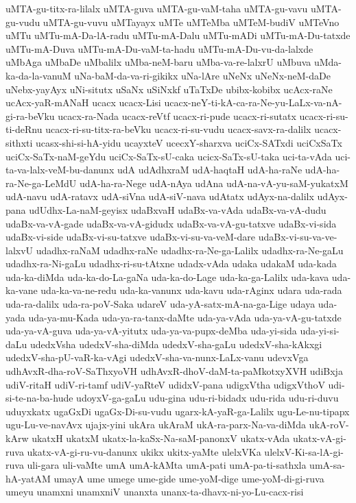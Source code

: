 {uMTA-gu-titx-ra-lilalx
uMTA-guva
uMTA-gu-vaM-taha
uMTA-gu-vavu
uMTA-gu-vudu
uMTA-gu-vuvu
uMTayayx
uMTe
uMTeMba
uMTeM-budiV
uMTeVno
uMTu
uMTu-mA-Da-lA-radu
uMTu-mA-Dalu
uMTu-mADi
uMTu-mA-Du-tatxde
uMTu-mA-Duva
uMTu-mA-Du-vaM-ta-hadu
uMTu-mA-Du-vu-da-lalxde
uMbAga
uMbaDe
uMbalilx
uMba-neM-baru
uMba-va-re-lalxrU
uMbuva
uMda-ka-da-la-vanuM
uNa-baM-da-va-ri-gikikx
uNa-lAre
uNeNx
uNeNx-neM-daDe
uNebx-yayAyx
uNi-situtx
uSaNx
uSiNxkf
uTaTxDe
ubibx-kobibx
ucAcx-raNe
ucAcx-yaR-mANaH
ucacx
ucacx-Lisi
ucacx-neY-ti-kA-ca-ra-Ne-yu-LaLx-va-nA-gi-ra-beVku
ucacx-ra-Nada
ucacx-reVtf
ucacx-ri-pude
ucacx-ri-sutatx
ucacx-ri-su-ti-deRnu
ucacx-ri-su-titx-ra-beVku
ucacx-ri-su-vudu
ucacx-savx-ra-dalilx
ucacx-sithxti
ucasx-shi-si-hA-yidu
ucayxteV
ucecxY-sharxva
uciCx-SATxdi
uciCxSaTx
uciCx-SaTx-naM-geYdu
uciCx-SaTx-sU-caka
ucicx-SaTx-sU-taka
uci-ta-vAda
uci-ta-va-lalx-veM-bu-danunx
udA
udAdhxraM
udA-haqtaH
udA-ha-raNe
udA-ha-ra-Ne-ga-LeMdU
udA-ha-ra-Nege
udA-nAya
udAna
udA-na-vA-yu-saM-yukatxM
udA-navu
udA-ratavx
udA-siVna
udA-siV-nava
udAtatx
udAyx-na-dalilx
udAyx-pana
udUdhx-La-naM-geyisx
udaBxvaH
udaBx-va-vAda
udaBx-va-vA-dudu
udaBx-va-vA-gade
udaBx-va-vA-gidudx
udaBx-va-vA-gu-tatxve
udaBx-vi-sida
udaBx-vi-side
udaBx-vi-su-tatxve
udaBx-vi-su-va-veM-dare
udaBx-vi-su-va-ve-lalxvU
udadhx-raNaM
udadhx-raNe
udadhx-ra-Ne-ga-Lalilx
udadhx-ra-Ne-gaLu
udadhx-ra-Ni-gaLu
udadhx-ri-su-tAtxne
udadx-vAda
udaka
udakaM
uda-kada
uda-ka-diMda
uda-ka-do-La-gaNa
uda-ka-do-Lage
uda-ka-ga-Lalilx
uda-kava
uda-ka-vane
uda-ka-va-ne-redu
uda-ka-vanunx
uda-kavu
uda-rAginx
udara
uda-rada
uda-ra-dalilx
uda-ra-poV-Saka
udareV
uda-yA-satx-mA-na-ga-Lige
udaya
uda-yada
uda-ya-mu-Kada
uda-ya-ra-tanx-daMte
uda-ya-vAda
uda-ya-vA-gu-tatxde
uda-ya-vA-guva
uda-ya-vA-yitutx
uda-ya-va-pupx-deMba
uda-yi-sida
uda-yi-si-daLu
udedxVsha
udedxV-sha-diMda
udedxV-sha-gaLu
udedxV-sha-kAkxgi
udedxV-sha-pU-vaR-ka-vAgi
udedxV-sha-va-nunx-LaLx-vanu
udevxVga
udhAvxR-dha-roV-SaThxyoVH
udhAvxR-dhoV-daM-ta-paMkotxyXVH
udiBxja
udiV-ritaH
udiV-ri-tamf
udiV-yaRteV
udidxV-pana
udigxVtha
udigxVthoV
udi-si-te-na-ba-hude
udoyxV-ga-gaLu
udu-gina
udu-ri-bidadx
udu-rida
udu-ri-duvu
uduyxkatx
ugaGxDi
ugaGx-Di-su-vudu
ugarx-kA-yaR-ga-Lalilx
ugu-Le-nu-tipapx
ugu-Lu-ve-navAvx
ujajx-yini
ukAra
ukAraM
ukA-ra-parx-Na-va-diMda
ukA-roV-kArw
ukatxH
ukatxM
ukatx-la-kaSx-Na-saM-panonxV
ukatx-vAda
ukatx-vA-gi-ruva
ukatx-vA-gi-ru-vu-danunx
ukikx
ukitx-yaMte
ulelxVKa
ulelxV-Ki-sa-lA-gi-ruva
uli-gara
uli-vaMte
umA
umA-kAMta
umA-pati
umA-pa-ti-sathxla
umA-sa-hA-yatAM
umayA
ume
umege
ume-gide
ume-yoM-dige
ume-yoM-di-gi-ruva
umeyu
unamxni
unamxniV
unanxta
unanx-ta-dhavx-ni-yo-Lu-cacx-risi
}
